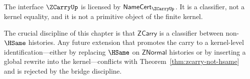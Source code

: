 \begin{corollary}
\label{cor:zcarry-licensed-not-primitive}
The interface \(\ZCarryUp\) is licensed by \(\mathsf{NameCert}_{\ZCarryUp}\). It is a classifier, not a kernel equality, and it is not a primitive object of the finite kernel.
\end{corollary}

\begin{remark}
The crucial discipline of this chapter is that \(\mathsf{ZCarry}\) is a classifier between non-\(\HSame\) histories. Any future extension that promotes the carry to a kernel-level identification—either by replacing \(\HSame\) on \(\mathsf{ZNormal}\) histories or by inserting a global rewrite into the kernel—conflicts with Theorem~\ref{thm:zcarry-not-hsame} and is rejected by the bridge discipline.
\end{remark}
